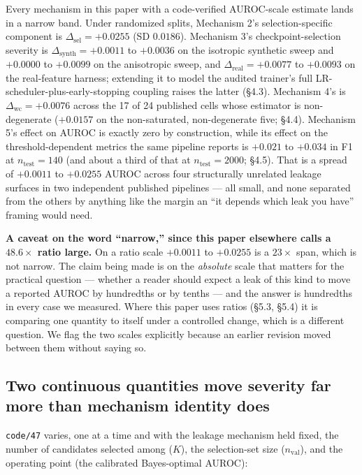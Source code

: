 \documentclass[10pt]{article} %
\begin{document}
Every mechanism in this paper with a code-verified AUROC-scale estimate lands
in a narrow band. Under randomized splits, Mechanism 2's selection-specific
component is $\Delta_{\text{sel}}=+0.0255$ (SD $0.0186$). Mechanism 3's
checkpoint-selection severity is $\Delta_{\text{synth}}=+0.0011$ to $+0.0036$
on the isotropic synthetic sweep and $+0.0000$ to $+0.0099$ on the anisotropic
sweep, and $\Delta_{\text{real}}=+0.0077$ to $+0.0093$ on the real-feature
harness; extending it to model the audited trainer's full
LR-scheduler-plus-early-stopping coupling raises the latter (§4.3). Mechanism
4's is $\Delta_{\text{wc}}=+0.0076$ across the 17 of 24 published cells whose
estimator is non-degenerate ($+0.0157$ on the non-saturated, non-degenerate
five; §4.4). Mechanism 5's effect on AUROC is exactly zero by construction,
while its effect on the threshold-dependent metrics the same pipeline reports
is $+0.021$ to $+0.034$ in F1 at $n_{\text{test}}=140$ (and about a third of
that at $n_{\text{test}}=2000$; §4.5). That is a spread of $+0.0011$ to
$+0.0255$ AUROC across four structurally unrelated leakage surfaces in two
independent published pipelines --- all small, and none separated from the
others by anything like the margin an ``it depends which leak you have''
framing would need.

\textbf{A caveat on the word ``narrow,'' since this paper elsewhere calls a
$48.6\times$ ratio large.} On a ratio scale $+0.0011$ to $+0.0255$ is a
$23\times$ span, which is not narrow. The claim being made is on the
\emph{absolute} scale that matters for the practical question --- whether a
reader should expect a leak of this kind to move a reported AUROC by hundredths
or by tenths --- and the answer is hundredths in every case we measured. Where
this paper uses ratios (§5.3, §5.4) it is comparing one quantity to itself
under a controlled change, which is a different question. We flag the two
scales explicitly because an earlier revision moved between them without
saying so.

\subsection{Two continuous quantities move severity far more than mechanism identity does}

\texttt{code/47} varies, one at a time and with the leakage mechanism held
fixed, the number of candidates selected among ($K$), the selection-set size
($n_{\text{val}}$), and the operating point (the calibrated Bayes-optimal
AUROC):
\end{document}
